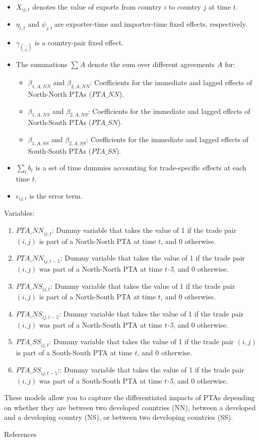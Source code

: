 \begin{itemize}
\item
  \(X_{ij,t}\)\hspace{0pt} denotes the value of exports from country
  \(i\) to country \(j\) at time \(t\).
\item
  \(\eta_{i,t}\) and \(\psi_{j,t}\ \)are exporter-time and importer-time
  fixed effects, respectively.
\item
  \(\gamma_{\binom{-}{ij}}\) is a country-pair fixed effect.
\item
  The summations \hspace{0pt}\(\sum_{}^{}A\) denote the sum over
  different agreements \(A\) for:

  \begin{itemize}
  \item
    \(\beta_{1,A,NN}\) and \(\beta_{2,A,NN}\): Coefficients for the
    immediate and lagged effects of North-North PTAs
    \hspace{0pt}(\(PTA\_ NN\)).
  \item
    \(\beta_{1,A,NS}\) and \(\beta_{2,A,NS}\): Coefficients for the
    immediate and lagged effects of North-South PTAs (\(PTA\_ SN\)).
  \item
    \(\beta_{1,A,SS}\) and \(\beta_{2,A,SS}\): Coefficients for the
    immediate and lagged effects of South-South PTAs (\(PTA\_ SS\)).
  \end{itemize}
\item
  \(\sum_{t}^{}b_{t}\) is a set of time dummies accounting for
  trade-specific effects at each time \(t\).
\item
  \(\epsilon_{ij,t}\) is the error term.
\end{itemize}

Variables:

\begin{enumerate}
\def\labelenumi{\arabic{enumi}.}
\item
  \({PTA\_ NN}_{ij,t}\): Dummy variable that takes the value of 1 if the
  trade pair \((i,j)\) is part of a North-North PTA at time \(t\), and 0
  otherwise.
\item
  \({PTA\_ NN}_{ij,t - 5}\): Dummy variable that takes the value of 1 if
  the trade pair \((i,j)\) was part of a North-North PTA at time
  \(t\)\emph{-5}, and 0 otherwise.
\item
  \({PTA\_ NS}_{ij,t}\): Dummy variable that takes the value of 1 if the
  trade pair \((i,j)\) is part of a North-South PTA at time \(t\), and 0
  otherwise.
\item
  \({PTA\_ NS}_{ij,t - 5}\): Dummy variable that takes the value of 1 if
  the trade pair \((i,j)\) was part of a North-South PTA at time
  \(t\)\emph{-5}, and 0 otherwise.
\item
  \({PTA\_ SS}_{ij,t}\): Dummy variable that takes the value of 1 if the
  trade pair \((i,j)\) is part of a South-South PTA at time \(t\), and 0
  otherwise.
\item
  \({PTA\_ SS}_{ij,t - 5}\):: Dummy variable that takes the value of 1
  if the trade pair \((i,j)\) was part of a South-South PTA at time
  \(t\)\emph{-5}, and 0 otherwise.
\end{enumerate}

These models allow you to capture the differentiated impacts of PTAs
depending on whether they are between two developed countries (NN),
between a developed and a developing country (NS), or between two
developing countries (SS).

References
